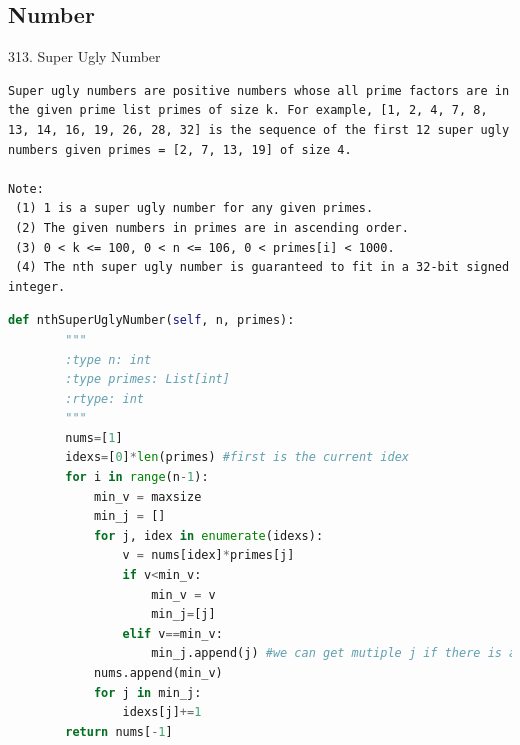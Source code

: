 \documentclass[../main.tex]{subfiles}
\begin{document}
\subsection{Number}
313. Super Ugly Number
\begin{lstlisting}
Super ugly numbers are positive numbers whose all prime factors are in the given prime list primes of size k. For example, [1, 2, 4, 7, 8, 13, 14, 16, 19, 26, 28, 32] is the sequence of the first 12 super ugly numbers given primes = [2, 7, 13, 19] of size 4.

Note:
 (1) 1 is a super ugly number for any given primes.
 (2) The given numbers in primes are in ascending order.
 (3) 0 < k <= 100, 0 < n <= 106, 0 < primes[i] < 1000.
 (4) The nth super ugly number is guaranteed to fit in a 32-bit signed integer.
\end{lstlisting}
\begin{lstlisting}[language=Python]
def nthSuperUglyNumber(self, n, primes):
        """
        :type n: int
        :type primes: List[int]
        :rtype: int
        """
        nums=[1]
        idexs=[0]*len(primes) #first is the current idex
        for i in range(n-1):
            min_v = maxsize
            min_j = []
            for j, idex in enumerate(idexs):
                v = nums[idex]*primes[j]
                if v<min_v:
                    min_v = v
                    min_j=[j]
                elif v==min_v:
                    min_j.append(j) #we can get mutiple j if there is a tie
            nums.append(min_v)
            for j in min_j:
                idexs[j]+=1 
        return nums[-1]
\end{lstlisting}
\end{document}
